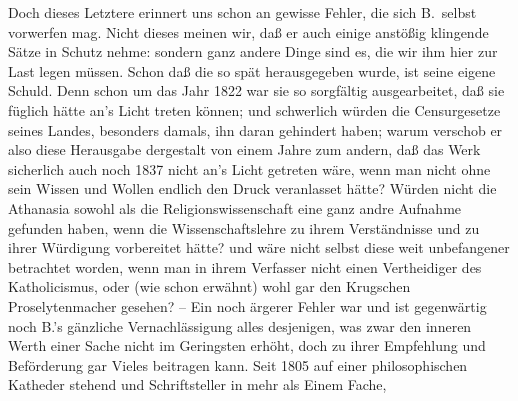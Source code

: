 Doch dieses Letztere erinnert uns schon an gewisse Fehler, die sich B.\ selbst vorwerfen mag. Nicht dieses meinen wir, daß er auch einige anstößig klingende Sätze in Schutz nehme: sondern ganz andere Dinge sind es, die wir ihm hier zur Last legen müssen. Schon daß die  so spät herausgegeben wurde, ist seine eigene Schuld. Denn schon um das Jahr 1822 war sie so sorgfältig ausgearbeitet, daß sie füglich hätte an's Licht treten können; und schwerlich würden die Censurgesetze seines Landes, besonders damals, ihn daran gehindert haben; warum verschob er also diese Herausgabe dergestalt von einem Jahre zum andern, daß das Werk sicherlich auch noch 1837 nicht an's Licht getreten wäre, wenn man nicht ohne sein Wissen und Wollen endlich den Druck veranlasset hätte? Würden nicht die Athanasia sowohl als die Religionswissenschaft eine ganz andre Aufnahme gefunden haben, wenn die Wissenschaftslehre zu ihrem Verständnisse und zu ihrer Würdigung vorbereitet hätte? und wäre nicht selbst diese weit  unbefangener betrachtet worden, wenn man in ihrem Verfasser nicht einen Vertheidiger des Katholicismus, oder (wie schon erwähnt) wohl gar den Krugschen Proselytenmacher gesehen? -- Ein noch ärgerer Fehler war und ist gegenwärtig noch B.'s gänzliche Vernachlässigung alles desjenigen, was zwar den inneren Werth einer Sache nicht im Geringsten erhöht, doch zu ihrer Empfehlung und Beförderung gar Vieles beitragen kann. Seit 1805 auf einer philosophischen Katheder stehend und Schriftsteller in mehr als Einem Fache, 
